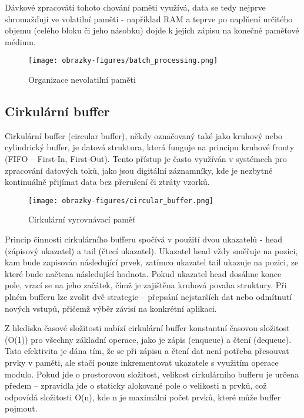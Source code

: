 Dávkové zpracovátí tohoto chování paměti využívá, data se tedy nejprve shromažďují ve volatilní paměti - například RAM a teprve po naplňení určitého objemu (celého bloku či jeho násobku) 
dojde k jejich zápisu na konečné paměťové médium.

\begin{figure}[h]
    \centering
    \texttt{[image: obrazky-figures/batch\_processing.png]}
    
    \caption{Organizace nevolatilní paměti}
    \label{fig:batch-processing}
\end{figure}


\subsection{Cirkulární buffer}
Cirkulární buffer (circular buffer), někdy označovaný také jako kruhový nebo cylindrický buffer, je datová struktura, která funguje na principu kruhové fronty (FIFO – First-In, First-Out). 
Tento přístup je často využíván v systémech pro zpracování datových toků, jako jsou digitální záznamníky, kde je nezbytné kontinuálně přijímat data bez přerušení či ztráty vzorků.


\begin{figure}[h]
    \centering
    \texttt{[image: obrazky-figures/circular\_buffer.png]}
    
    \caption{Cirkulární vyrovnávací paměť}
    \label{fig:circular-buffer}
\end{figure}

\newpage

Princip činnosti cirkulárního bufferu spočívá v použití dvou ukazatelů - head (zápisový ukazatel) a tail (čtecí ukazatel). Ukazatel head vždy směřuje na pozici, kam bude zapisován následující 
prvek, zatímco ukazatel tail ukazuje na pozici, ze které bude načtena následující hodnota. Pokud ukazatel head dosáhne konce pole, vrací se na jeho začátek, čímž je zajištěna kruhová povaha 
struktury. Při plném bufferu lze zvolit dvě strategie – přepsání nejstarších dat nebo odmítnutí nových vstupů, přičemž výběr závisí na konkrétní 
aplikaci.\cite{embedjournal_ring_buffer, medium_ring_buffer}

Z hlediska časové složitosti nabízí cirkulární buffer konstantní časovou složitost (O(1)) pro všechny základní operace, jako je zápis (enqueue) a  čtení (dequeue). Tato efektivita je 
dána tím, že se při zápisu a čtení dat není potřeba přesouvat prvky v paměti, ale stačí pouze inkrementovat ukazatele s využitím operace modulo. Pokud jde o prostorovou složitost, 
velikost cirkulárního bufferu je určena předem – zpravidla jde o staticky alokované pole o velikosti n prvků, což odpovídá složitosti O(n), kde n je maximální počet prvků, které může 
buffer pojmout. \cite{petrungaro_ring_buffer_complexity}

